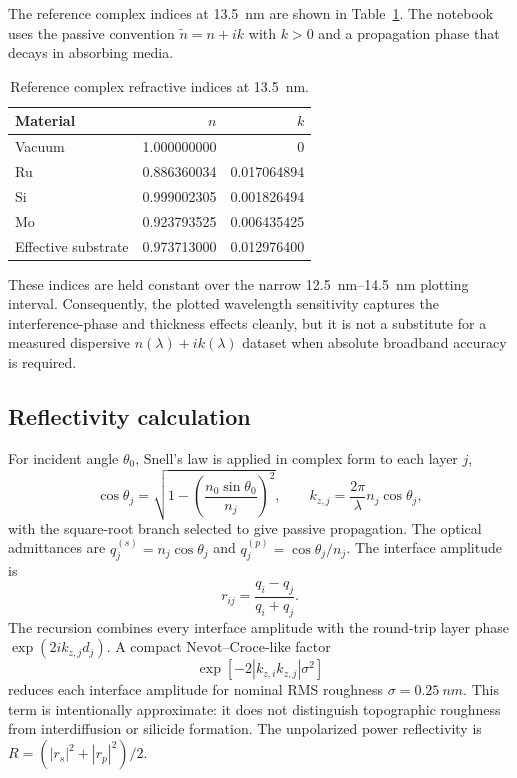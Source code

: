 \documentclass[11pt,a4paper]{article}
\begin{document}
The reference complex indices at \SI{13.5}{nm} are shown in
Table~\ref{tab:indices}.  The notebook uses the passive convention
$\tilde n=n+ik$ with $k>0$ and a propagation phase that decays in absorbing
media.

\begin{table}[H]
\centering
\caption{Reference complex refractive indices at \SI{13.5}{nm}.}
\label{tab:indices}
\begin{tabular}{@{}lrr@{}}
\toprule
Material & $n$ & $k$ \\
\midrule
Vacuum & 1.000000000 & 0 \\
Ru & 0.886360034 & 0.017064894 \\
Si & 0.999002305 & 0.001826494 \\
Mo & 0.923793525 & 0.006435425 \\
Effective substrate & 0.973713000 & 0.012976400 \\
\bottomrule
\end{tabular}
\end{table}

These indices are held constant over the narrow \SIrange{12.5}{14.5}{nm}
plotting interval.  Consequently, the plotted wavelength sensitivity captures
the interference-phase and thickness effects cleanly, but it is not a
substitute for a measured dispersive $n(\lambda)+ik(\lambda)$ dataset when
absolute broadband accuracy is required.

\subsection{Reflectivity calculation}

For incident angle $\theta_0$, Snell's law is applied in complex form to each
layer $j$,
\begin{equation}
 \cos\theta_j=\sqrt{1-\left(\frac{n_0\sin\theta_0}{n_j}\right)^2},
 \qquad k_{z,j}=\frac{2\pi}{\lambda}n_j\cos\theta_j,
\end{equation}
with the square-root branch selected to give passive propagation.  The optical
admittances are $q_j^{(s)}=n_j\cos\theta_j$ and
$q_j^{(p)}=\cos\theta_j/n_j$.  The interface amplitude is
\begin{equation}
 r_{ij}=\frac{q_i-q_j}{q_i+q_j}.
\end{equation}
The recursion combines every interface amplitude with the round-trip layer
phase $\exp(2ik_{z,j}d_j)$.  A compact Nevot--Croce-like factor
\begin{equation}
 \exp\!\left[-2\left|k_{z,i}k_{z,j}\right|\sigma^2\right]
\end{equation}
reduces each interface amplitude for nominal RMS roughness
$\sigma=\SI{0.25}{nm}$.  This term is intentionally approximate: it does not
distinguish topographic roughness from interdiffusion or silicide formation.
The unpolarized power reflectivity is
$R=(|r_s|^2+|r_p|^2)/2$.
\end{document}

